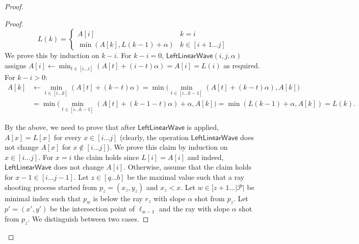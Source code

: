\documentclass[10pt,a4paper]{article}
\newcommand{\LLW}{\mathsf{LeftLinearWave}}
\renewcommand{\P}{\mathcal{P}}
\newcommand{\ray}{r}
\begin{document}
\begin{proof}
\begin{proof}
$$L(k) = \begin{cases}
A[i] & k=i
\\
\min(A[k], L(k-1) + \alpha) & k \in [i+1 \ldots j]
\end{cases}
$$
We prove this by induction on $k-i$.
For $k-i = 0$, $\LLW(i,j,\alpha)$ assigns $A[i] \leftarrow \min_{t\in [i\ldots i]}(A[t] + (i-t) \alpha) = A[i] = L(i)$ as required.
For $k - i > 0$:
\begin{align*}
A[k] & \leftarrow \min_{t\in [i\ldots k]}(A[t] + (k-t) \alpha) = \min\big( \min_{t\in [i\ldots k-1]}(A[t] + (k-t) \alpha) , A[k] \big) \\
&=   \min\big( \min_{t\in [i\ldots k-1]}(A[t] + (k- 1 - t) \alpha) + \alpha , A[k] \big) = \min(L(k-1) + \alpha , A[k] ) = L(k). 
\end{align*}

By the above, we need to prove that after $\LLW$ is applied, $A[x] = L[x]$ for every $x\in[i\ldots j]$ (clearly, the operation $\LLW$ does not change $A[x]$ for $x\notin [i\ldots j]$).
We prove this claim by induction on $x \in [i \ldots j]$. 
For $x=i$ the claim holds since $L[i]=A[i]$ and indeed, $\LLW$ does not change $A[i]$. 
Otherwise, assume that the claim holds for $x-1 \in [i\ldots j-1]$.
Let $z\in[q\ldots b]$ be the maximal value such that a ray shooting process started from $p_z = (x_z,y_z)$ and $x_z < x$. 
Let $w\in [z+1\ldots |\P|$ be minimal index such that $p_w$ is below the ray $\ray_z$ with slope $\alpha$ shot from $p_z$. Let $p'=(x',y')$ be the intersection point of $\ell_{w-1}$ and the ray with slope $\alpha$ shot from $p_z$.
We distinguish between two cases.


\end{proof}
\end{proof}
\end{document}
